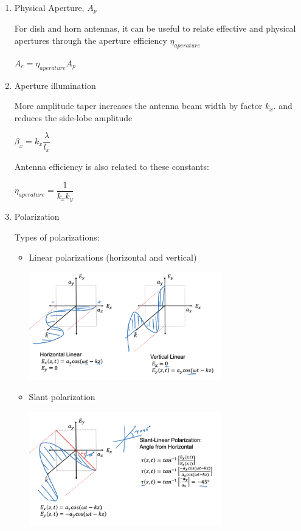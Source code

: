 \documentclass[10pt]{article}
\renewcommand{\frac}{\dfrac}
\begin{document}
\begin{enumerate}
	
	\item Physical Aperture, $A_p$
	
	For dish and horn antennas, it can be useful to relate effective and physical apertures through the aperture efficiency $\eta _{aperature}$
	
	$A_e = \eta_{aperature} A_p$

	\item Aperture illumination
	
	More amplitude taper increases the antenna beam width by factor $k_x$. and reduces the side-lobe amplitude
	
	$\beta_x = k_x \frac{\lambda}{l_x}$ 
	
	Antenna efficiency is also related to these constants:
	
	$\eta_{aperature} = \frac{1}{k_x k_y}$
	
	
	\item Polarization
	
	Types of polarizations:
	\begin{itemize}
	\item Linear polarizations (horizontal and vertical)
	
	\includegraphics[width=0.69\textwidth]{figs/linearpolarization.png}
	
	\item Slant polarization
	
	\includegraphics[width=0.69\textwidth]{figs/slantpolarization.png}
	

\end{itemize}
\end{enumerate}
\end{document}
